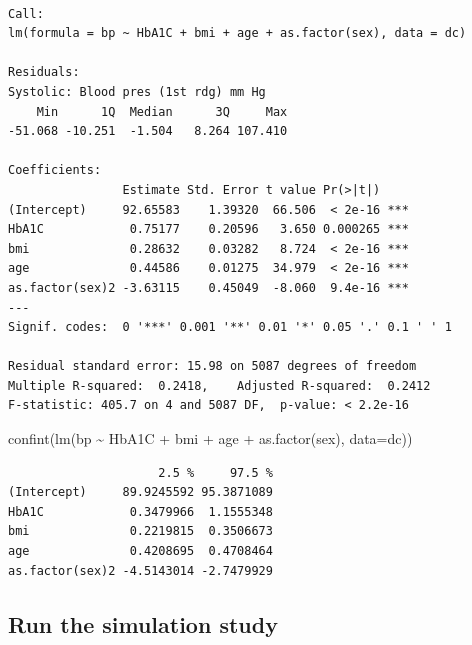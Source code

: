 \documentclass[
  letterpaper,
  DIV=11,
  numbers=noendperiod]{scrartcl}
\newenvironment{Shaded}{\begin{snugshade}}{\end{snugshade}}
\newcommand{\AttributeTok}[1]{\textcolor[rgb]{0.40,0.45,0.13}{#1}}
\newcommand{\FunctionTok}[1]{\textcolor[rgb]{0.28,0.35,0.67}{#1}}
\newcommand{\NormalTok}[1]{\textcolor[rgb]{0.00,0.23,0.31}{#1}}
\newcommand{\SpecialCharTok}[1]{\textcolor[rgb]{0.37,0.37,0.37}{#1}}
\begin{document}
\begin{verbatim}

Call:
lm(formula = bp ~ HbA1C + bmi + age + as.factor(sex), data = dc)

Residuals:
Systolic: Blood pres (1st rdg) mm Hg 
    Min      1Q  Median      3Q     Max 
-51.068 -10.251  -1.504   8.264 107.410 

Coefficients:
                Estimate Std. Error t value Pr(>|t|)    
(Intercept)     92.65583    1.39320  66.506  < 2e-16 ***
HbA1C            0.75177    0.20596   3.650 0.000265 ***
bmi              0.28632    0.03282   8.724  < 2e-16 ***
age              0.44586    0.01275  34.979  < 2e-16 ***
as.factor(sex)2 -3.63115    0.45049  -8.060  9.4e-16 ***
---
Signif. codes:  0 '***' 0.001 '**' 0.01 '*' 0.05 '.' 0.1 ' ' 1

Residual standard error: 15.98 on 5087 degrees of freedom
Multiple R-squared:  0.2418,    Adjusted R-squared:  0.2412 
F-statistic: 405.7 on 4 and 5087 DF,  p-value: < 2.2e-16
\end{verbatim}

\begin{Shaded}
\begin{Highlighting}[]
\FunctionTok{confint}\NormalTok{(}\FunctionTok{lm}\NormalTok{(bp }\SpecialCharTok{\textasciitilde{}}\NormalTok{ HbA1C }\SpecialCharTok{+}\NormalTok{ bmi }\SpecialCharTok{+}\NormalTok{ age }\SpecialCharTok{+} \FunctionTok{as.factor}\NormalTok{(sex), }\AttributeTok{data=}\NormalTok{dc))}
\end{Highlighting}
\end{Shaded}

\begin{verbatim}
                     2.5 %     97.5 %
(Intercept)     89.9245592 95.3871089
HbA1C            0.3479966  1.1555348
bmi              0.2219815  0.3506673
age              0.4208695  0.4708464
as.factor(sex)2 -4.5143014 -2.7479929
\end{verbatim}

\hypertarget{run-the-simulation-study}{%
\subsection{Run the simulation study}\label{run-the-simulation-study}}
\end{document}
